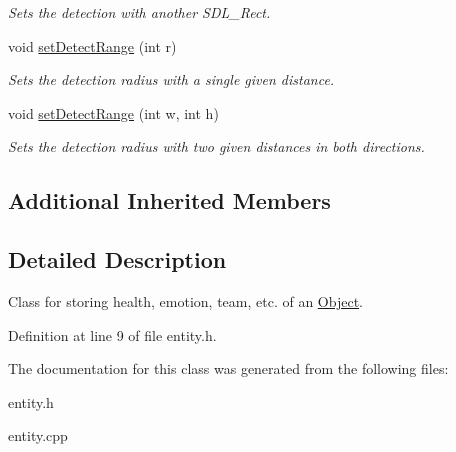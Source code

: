 \begin{DoxyCompactItemize}
\begin{DoxyCompactList}\small\item\em Sets the detection with another S\+D\+L\+\_\+\+Rect. \end{DoxyCompactList}\item 
\mbox{\label{classEntity_a884a7f8a537f3d0e926dfedb8e88a740}} 
void \hyperlink{classEntity_a884a7f8a537f3d0e926dfedb8e88a740}{set\+Detect\+Range} (int r)
\begin{DoxyCompactList}\small\item\em Sets the detection radius with a single given distance. \end{DoxyCompactList}\item 
\mbox{\label{classEntity_af4b91451301036e4aed029e90a7ba726}} 
void \hyperlink{classEntity_af4b91451301036e4aed029e90a7ba726}{set\+Detect\+Range} (int w, int h)
\begin{DoxyCompactList}\small\item\em Sets the detection radius with two given distances in both directions. \end{DoxyCompactList}\end{DoxyCompactItemize}
\subsection*{Additional Inherited Members}


\subsection{Detailed Description}
Class for storing health, emotion, team, etc. of an \hyperlink{classObject}{Object}. 

Definition at line 9 of file entity.\+h.



The documentation for this class was generated from the following files\+:\begin{DoxyCompactItemize}
\item 
entity.\+h\item 
entity.\+cpp\end{DoxyCompactItemize}
